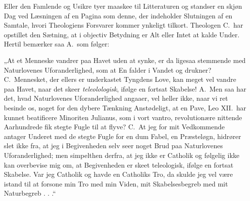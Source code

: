 Eller den Famlende og Usikre tyer maaskee til Litteraturen og standser en
skjøn Dag ved Læsningen af en Pagina som denne,
der indeholder Slutningen
af en Samtale, hvori Theologiens Forsvarer kommer ynkeligt tilkort.
Theologen C.\ har opstillet den Sætning, at i objectiv Betydning er Alt eller
Intet at kalde Under. Hertil bemærker saa A.\ som følger:

„At et Menneske vandrer paa Havet uden at synke, er da ligesaa stemmende med
Naturlovenes Uforanderlighed, som at En falder i Vandet og drukner? C.\
Mennesket, der ellers er underkastet Tyngdens Love, kan meget vel vandre paa
Havet, naar det skeer \emph{teleolologisk}, ifølge en fortsat Skabelse! A.\ Men
saa har det, hvad Naturlovenes Uforanderlighed angaaer, vel heller ikke, naar
vi ret besinde os, noget for den dybere Tænkning Anstødeligt, at en Pave, Leo
XII.\ har kunnet beatificere Minoriten Julianus, som i vort vantro,
revolutionære nittende Aarhundrede fik stegte Fugle til at flyve? C.\ At jeg
for mit Vedkommende antager Underet med de stegte Fugle for en dum Fabel, en
Præsteløgn, hidrører slet ikke fra, at jeg i Begivenheden selv seer noget Brud
paa Naturlovenes Uforanderlighed; men simpelthen derfra, at jeg ikke er
Catholik og følgelig ikke kan overbevise mig om, at Begivenheden er skeet
teleologisk, ifølge en fortsat Skabelse. Var jeg Catholik og havde en Catholiks
Tro, da skulde jeg vel være istand til at forsone min Tro med min Viden, mit
Skabelsesbegreb med mit Naturbegreb . . .“

